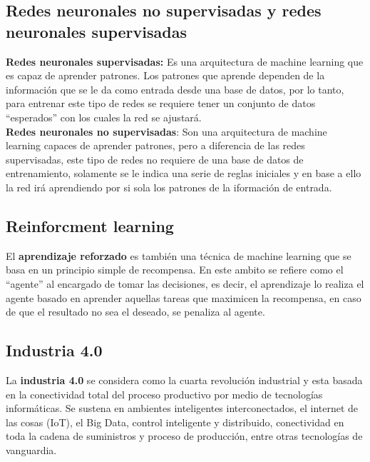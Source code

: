 \subsection{Redes neuronales no supervisadas y redes neuronales supervisadas}
\textbf{Redes neuronales supervisadas:} Es una arquitectura de machine learning que es capaz de aprender
patrones. Los patrones que aprende dependen de la información que se le da como entrada desde una base de
datos, por lo tanto, para entrenar este tipo de redes se requiere tener un conjunto de datos ``esperados''
con los cuales la red se ajustará.\\
\textbf{Redes neuronales no supervisadas}: Son una arquitectura de machine learning capaces de aprender
patrones, pero a diferencia de las redes supervisadas, este tipo de redes no requiere de una base de datos
de entrenamiento, solamente se le indica una serie de reglas iniciales y en base a ello la red irá aprendiendo
por si sola los patrones de la iformación de entrada.
\subsection{Reinforcment learning}
El \textbf{aprendizaje reforzado} es también una técnica de machine learning que se basa en un principio
simple de recompensa. En este ambito se refiere como el ``agente'' al encargado de tomar las decisiones,
es decir, el aprendizaje lo realiza el agente basado en aprender aquellas tareas que maximicen la recompensa,
en caso de que el resultado no sea el deseado, se penaliza al agente.
\subsection{Industria 4.0}
La \textbf{industria 4.0} se considera como la cuarta revolución industrial y esta basada en la conectividad
total del proceso productivo por medio de tecnologías informáticas. Se sustena en ambientes inteligentes
interconectados, el internet de las cosas (IoT), el Big Data, control inteligente y distribuido, conectividad
en toda la cadena de suministros y proceso de producción, entre otras tecnologías de vanguardia.